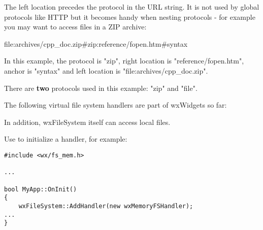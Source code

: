 
The left location precedes the protocol in the URL string. 
It is not used by global protocols like HTTP but it becomes handy when nesting
protocols - for example you may want to access files in a ZIP archive:

file:archives/cpp\_doc.zip\#zip:reference/fopen.htm\#syntax

In this example, the protocol is "zip", right location is
"reference/fopen.htm", anchor is "syntax" and left location
is "file:archives/cpp\_doc.zip". 

There are {\bf two} protocols used in this example: "zip" and "file".


The following virtual file system handlers are part of wxWidgets so far:

\begin{twocollist}
\end{twocollist}

In addition, wxFileSystem itself can access local files.



Use  to initialize
a handler, for example:

\begin{verbatim}
#include <wx/fs_mem.h>

...

bool MyApp::OnInit()
{
    wxFileSystem::AddHandler(new wxMemoryFSHandler);
...
}
\end{verbatim}

